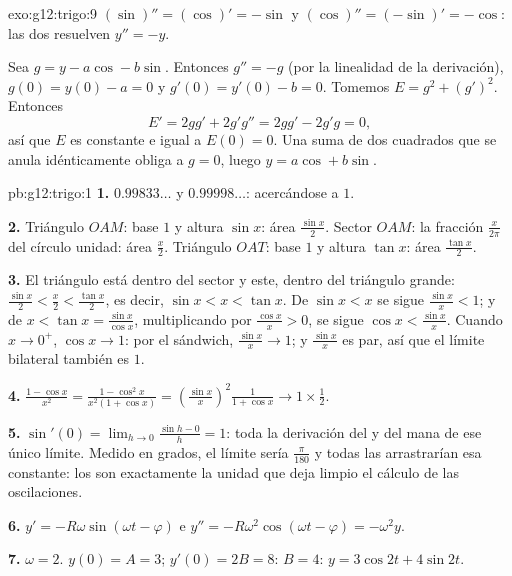 \begin{solution}{exo:g12:trigo:9}
$(\sin)'' = (\cos)' = -\sin$ y $(\cos)'' = (-\sin)' = -\cos$: las dos
resuelven $y'' = -y$.

Sea $g = y - a\cos - b\sin$. Entonces $g'' = -g$ (por la linealidad de la
derivación), $g(0) = y(0) - a = 0$ y $g'(0) = y'(0) - b = 0$. Tomemos
$E = g^2 + (g')^2$. Entonces
\[
E' = 2g g' + 2g' g'' = 2g g' - 2g' g = 0,
\]
así que $E$ es constante e igual a $E(0) = 0$. Una suma de dos cuadrados
que se anula idénticamente obliga a $g = 0$, luego
$y = a\cos + b\sin$.
\end{solution}

\begin{solution}{pb:g12:trigo:1}
\textbf{1.} $0.99833\ldots$ y $0.99998\ldots$: acercándose a $1$.

\textbf{2.} Triángulo $OAM$: base $1$ y altura $\sin x$: área
$\frac{\sin x}{2}$. Sector $OAM$: la fracción $\frac{x}{2\pi}$ del círculo
unidad: área $\frac x2$. Triángulo $OAT$: base $1$ y altura $\tan x$: área
$\frac{\tan x}{2}$.

\textbf{3.} El triángulo está dentro del sector y este, dentro del
triángulo grande: $\frac{\sin x}{2} < \frac x2 < \frac{\tan x}{2}$, es
decir, $\sin x < x < \tan x$. De $\sin x < x$ se sigue
$\frac{\sin x}{x} < 1$; y de $x < \tan x = \frac{\sin x}{\cos x}$,
multiplicando por $\frac{\cos x}{x} > 0$, se sigue
$\cos x < \frac{\sin x}{x}$. Cuando $x \to 0^+$, $\cos x \to 1$: por el
sándwich, $\frac{\sin x}{x} \to 1$; y $\frac{\sin x}{x}$ es par, así que el
límite bilateral también es $1$.

\textbf{4.} $\frac{1 - \cos x}{x^2} = \frac{1 - \cos^2 x}{x^2 (1 + \cos x)}
= \left(\frac{\sin x}{x}\right)^2 \frac{1}{1 + \cos x} \to
1 \times \frac12$.

\textbf{5.} $\sin'(0) = \lim_{h \to 0} \frac{\sin h - 0}{h} = 1$: toda la
derivación del  y del  mana de ese único límite. Medido en
grados, el límite sería $\frac{\pi}{180}$ y todas las 
arrastrarían esa constante: los  son exactamente la unidad que deja
limpio el cálculo de las oscilaciones.

\textbf{6.} $y' = -R\omega\sin(\omega t - \varphi)$ e
$y'' = -R\omega^2\cos(\omega t - \varphi) = -\omega^2 y$.

\textbf{7.} $\omega = 2$. $y(0) = A = 3$; $y'(0) = 2B = 8$: $B = 4$:
$y = 3\cos 2t + 4\sin 2t$.


\end{solution}
